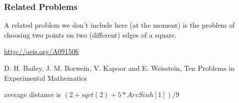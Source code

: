 \subsubsection{Related Problems}

A related problem we don't include here (at the moment) is the problem
of choosing two points on two (different) edges of a square.

\url{http://oeis.org/A091506}

D. H. Bailey, J. M. Borwein, V. Kapoor and E. Weisstein, Ten Problems
in Experimental Mathematics

average distance is $(2 + sqrt(2) + 5*ArcSinh[1])/9$


